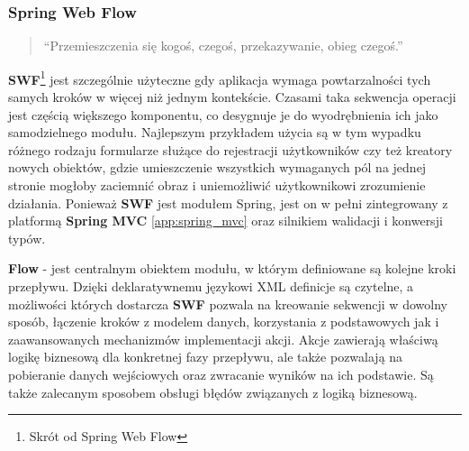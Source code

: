 		\subsubsection{Spring Web Flow}	
		\label{tech:spring_web_flow}
		\begin{quotation}
			``Przemieszczenia się kogoś, czegoś, przekazywanie, obieg czegoś.''\cite{polish_dictionary}
		\end{quotation}
		\textbf{SWF}\footnote{Skrót od Spring Web Flow} jest szczególnie użyteczne gdy aplikacja wymaga powtarzalności tych samych kroków w więcej niż jednym kontekście. Czasami taka sekwencja operacji jest częścią większego komponentu, co desygnuje je do wyodrębnienia ich jako samodzielnego modułu. Najlepszym przykładem użycia są w tym wypadku różnego rodzaju formularze służące do rejestracji użytkowników czy też kreatory nowych obiektów, gdzie umieszczenie wszystkich wymaganych pól na jednej stronie mogłoby zaciemnić obraz i uniemożliwić użytkownikowi zrozumienie działania. Ponieważ \textbf{SWF} jest modułem Spring, jest on w pełni zintegrowany z platformą \textbf{Spring MVC} \ref{app:spring_mvc} oraz silnikiem walidacji i konwersji typów.
		
		\textbf{Flow} \cite{spring_swf_reference} - jest centralnym obiektem modułu, w którym definiowane są kolejne kroki przepływu. Dzięki deklaratywnemu językowi XML definicje są czytelne, a możliwości których dostarcza \textbf{SWF} pozwala na kreowanie sekwencji w dowolny sposób, łączenie kroków z modelem danych, korzystania z podstawowych jak i zaawansowanych mechanizmów implementacji akcji. Akcje zawierają właściwą logikę biznesową dla konkretnej fazy przepływu, ale także pozwalają na pobieranie danych wejściowych oraz zwracanie wyników na ich podstawie. Są także zalecanym sposobem obsługi błędów związanych z logiką biznesową. 
		
		
